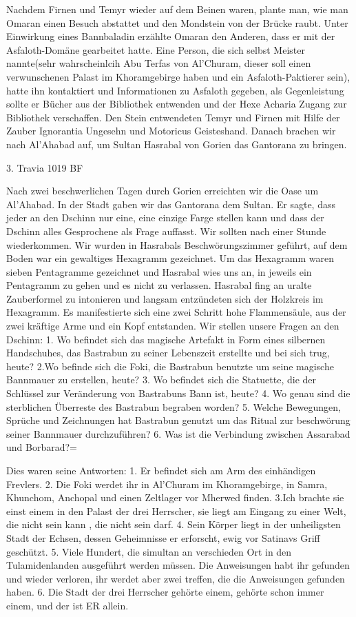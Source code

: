 Nachdem Firnen und Temyr wieder auf dem Beinen waren, plante man, wie man Omaran einen Besuch abstattet und den Mondstein von der Brücke raubt. Unter Einwirkung eines Bannbaladin erzählte Omaran den Anderen, dass er mit der Asfaloth-Domäne gearbeitet hatte. Eine Person, die sich selbst Meister nannte(sehr wahrscheinlcih Abu Terfas von Al'Churam, dieser soll einen verwunschenen Palast im Khoramgebirge haben und ein Asfaloth-Paktierer sein), hatte ihn kontaktiert und Informationen zu Asfaloth gegeben, als Gegenleistung sollte er Bücher aus der Bibliothek entwenden und der Hexe Acharia Zugang zur Bibliothek verschaffen.
Den Stein entwendeten Temyr und Firnen mit Hilfe der Zauber Ignorantia Ungesehn und Motoricus Geisteshand. Danach brachen wir nach Al'Ahabad auf, um Sultan Hasrabal von Gorien das Gantorana zu bringen.

3. Travia 1019 BF

Nach zwei beschwerlichen Tagen durch Gorien erreichten wir die Oase um Al'Ahabad. In der Stadt gaben wir das Gantorana dem Sultan. Er sagte, dass jeder an den Dschinn nur eine, eine einzige Farge stellen kann und dass der Dschinn alles Gesprochene als Frage auffasst. Wir sollten nach einer Stunde wiederkommen.
Wir wurden in Hasrabals Beschwörungszimmer geführt, auf dem Boden war ein gewaltiges Hexagramm gezeichnet. Um das Hexagramm waren sieben Pentagramme gezeichnet und Hasrabal wies uns an, in jeweils ein Pentagramm zu gehen und es nicht zu verlassen. Hasrabal fing an uralte Zauberformel zu intonieren und langsam entzündeten sich der Holzkreis im Hexagramm. Es manifestierte sich eine zwei Schritt hohe Flammensäule, aus der zwei kräftige Arme und ein Kopf entstanden.
Wir stellen unsere Fragen an den Dschinn:
1. Wo befindet sich das magische Artefakt in Form eines silbernen Handschuhes, das Bastrabun zu seiner Lebenszeit erstellte und bei sich trug, heute?
2.Wo befinde sich die Foki, die Bastrabun benutzte um seine magische Bannmauer zu erstellen, heute?
3. Wo befindet sich die Statuette, die der Schlüssel zur Veränderung von Bastrabuns Bann ist, heute?
4. Wo genau sind die sterblichen Überreste des Bastrabun begraben worden?
5. Welche Bewegungen, Sprüche und Zeichnungen hat Bastrabun genutzt um das Ritual zur beschwörung seiner Bannmauer durchzuführen?
6. Was ist die Verbindung zwischen Assarabad und Borbarad?=

Dies waren seine Antworten:
1. Er befindet sich am Arm des einhändigen Frevlers.
2. Die Foki werdet ihr in Al'Churam im Khoramgebirge, in Samra, Khunchom, Anchopal und einen Zeltlager vor Mherwed finden.
3.Ich brachte sie einst einem in den Palast der drei Herrscher, sie liegt am Eingang zu einer Welt, die nicht sein kann , die nicht sein darf.
4. Sein Körper liegt in der unheiligsten Stadt der Echsen, dessen Geheimnisse er erforscht, ewig vor Satinavs Griff geschützt.
5. Viele Hundert, die simultan an verschieden Ort in den Tulamidenlanden ausgeführt werden müssen. Die Anweisungen habt ihr gefunden und wieder verloren, ihr werdet aber zwei treffen, die die Anweisungen gefunden haben.
6. Die Stadt der drei Herrscher gehörte einem, gehörte schon immer einem, und der ist ER allein.

